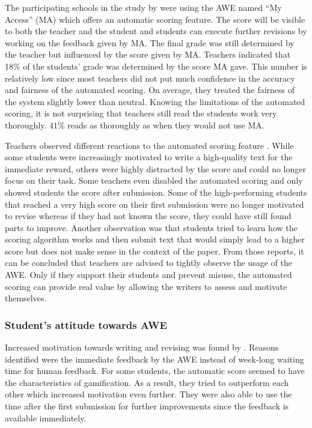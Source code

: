 \documentclass[runningheads]{llncs}
\begin{document}
The participating schools in the study by \textcite{grimes_utility_2010} were using the AWE named ``My Access'' (MA) which offers an automatic scoring feature. The score will be visible to both the teacher and the student and students can execute further revisions by working on the feedback given by MA. The final grade was still determined by the teacher but influenced by the score given by MA. Teachers indicated that 18\% of the students' grade was determined by the score MA gave. This number is relatively low since most teachers did not put much confidence in the accuracy and fairness of the automated scoring. On average, they treated the fairness of the system slightly lower than neutral. Knowing the limitations of the automated scoring, it is not surprising that teachers still read the students work very thoroughly. 41\% reads as thoroughly as when they would not use MA. 

Teachers observed different reactions to the automated scoring feature \citep{grimes_utility_2010}. While some students were increasingly motivated to write a high-quality text for the immediate reward, others were highly distracted by the score and could no longer focus on their task. Some teachers even disabled the automated scoring and only showed students the score after submission. Some of the high-performing students that reached a very high score on their first submission were no longer motivated to revise whereas if they had not known the score, they could have still found parts to improve. Another observation was that students tried to learn how the scoring algorithm works and then submit text that would simply lead to a higher score but does not make sense in the context of the paper. From those reports, it can be concluded that teachers are advised to tightly observe the usage of the AWE. Only if they support their students and prevent misuse, the automated scoring can provide real value by allowing the writers to assess and motivate themselves.

\subsubsection{Student's attitude towards AWE}
Increased motivation towards writing and revising was found by \textcite{grimes_utility_2010}. Reasons identified were the immediate feedback by the AWE instead of week-long waiting time for human feedback. For some students, the automatic score seemed to have the characteristics of gamification. As a result, they tried to outperform each other which increased motivation even further. They were also able to use the time after the first submission for further improvements since the feedback is available immediately.
\end{document}
